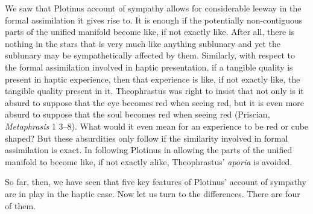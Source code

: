We saw that Plotinus account of sympathy allows for considerable leeway in the formal assimilation it gives rise to. It is enough if the potentially non-contiguous parts of the unified manifold become like, if not exactly like. After all, there is nothing in the stars that is very much like anything sublunary and yet the sublunary may be sympathetically affected by them. Similarly, with respect to the formal assimilation involved in haptic presentation, if a tangible quality is present in haptic experience, then that experience is like, if not exactly like, the tangible quality present in it. Theophrastus was right to insist that not only is it absurd to suppose that the eye becomes red when seeing red, but it is even more absurd to suppose that the soul becomes red when seeing red (Priscian, \emph{Metaphrasis} 1 3--8). What would it even mean for an experience to be red or cube shaped? But these absurdities only follow if the similarity involved in formal assimilation is exact. In following Plotinus in allowing the parts of the unified manifold to become like, if not exactly alike, Theophrastus' \emph{aporia} is avoided. 

So far, then, we have seen that five key features of Plotinus' account of sympathy are in play in the haptic case. Now let us turn to the differences. There are four of them.

